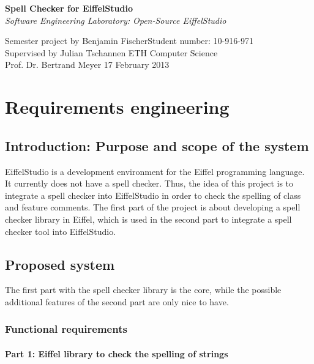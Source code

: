 \documentclass[paper=a4]{scrartcl}
\title{\Title}
\author{\Author}
\date{\Date}
\newcommand{\Title}{Spell Checker for EiffelStudio}
\newcommand{\Author}{Benjamin Fischer}
\newcommand{\Date}{17 February 2013}
\begin{document}
\begin{center}
\vspace*{2em}
\textbf{\LARGE \Title} \\
\vspace{2em}
\emph{\large Software Engineering Laboratory: Open-Source EiffelStudio} \\
\vspace{1em}
\end{center}
\begin{flushleft}
Semester project by \Author \hfill Student number: 10-916-971 \\
Supervised by Julian Tschannen \hfill ETH Computer Science \\
Prof. Dr. Bertrand Meyer \hfill \Date
\vspace{2em}
\end{flushleft}

\section{Requirements engineering}

\subsection{Introduction: Purpose and scope of the system}

EiffelStudio is a development environment for the Eiffel programming language. It currently does not have a spell checker. Thus, the idea of this project is to integrate a spell checker into EiffelStudio in order to check the spelling of class and feature comments. The first part of the project is about developing a spell checker library in Eiffel, which is used in the second part to integrate a spell checker tool into EiffelStudio.

\subsection{Proposed system}

The first part with the spell checker library is the core, while the possible additional features of the second part are only nice to have.

\subsubsection{Functional requirements}

\paragraph{Part 1: Eiffel library to check the spelling of strings}
\end{document}
